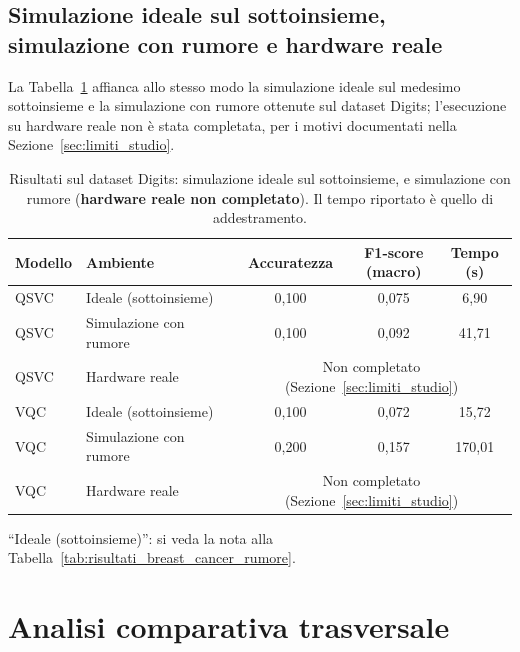 \subsection{Simulazione ideale sul sottoinsieme, simulazione con rumore e hardware reale}
La Tabella~\ref{tab:risultati_digits_rumore_hw} affianca allo stesso modo la simulazione ideale sul medesimo sottoinsieme e la simulazione con rumore ottenute sul dataset Digits; l'esecuzione su hardware reale non è stata completata, per i motivi documentati nella Sezione~\ref{sec:limiti_studio}.

\begin{table}[htbp]
\centering
\caption{Risultati sul dataset Digits: simulazione ideale sul sottoinsieme, e simulazione con rumore (\textbf{hardware reale non completato}). Il tempo riportato è quello di addestramento.}
\label{tab:risultati_digits_rumore_hw}
{\renewcommand{\arraystretch}{1.5} %
\footnotesize
\begin{tabular}{>{\raggedright\arraybackslash}p{1.6cm}>{\raggedright\arraybackslash}p{3cm}ccc}
\toprule
\textbf{Modello} & \textbf{Ambiente} & \textbf{Accuratezza} & \thead{\textbf{F1-score}\\\textbf{(macro)}} & \thead{\textbf{Tempo}\\\textbf{(s)}} \\
\midrule
QSVC & Ideale (sottoinsieme) & 0,100 & 0,075 & 6,90 \\
QSVC & Simulazione con rumore & 0,100 & 0,092 & 41,71 \\
QSVC & Hardware reale & \multicolumn{3}{c}{Non completato (Sezione~\ref{sec:limiti_studio})} \\
VQC & Ideale (sottoinsieme) & 0,100 & 0,072 & 15,72 \\
VQC & Simulazione con rumore & 0,200 & 0,157 & 170,01 \\
VQC & Hardware reale & \multicolumn{3}{c}{Non completato (Sezione~\ref{sec:limiti_studio})} \\
\bottomrule
\end{tabular}
}

\medskip
{\footnotesize ``Ideale (sottoinsieme)'': si veda la nota alla Tabella~\ref{tab:risultati_breast_cancer_rumore}.}
\end{table}

\section{Analisi comparativa trasversale}
\label{sec:analisi_comparativa}

